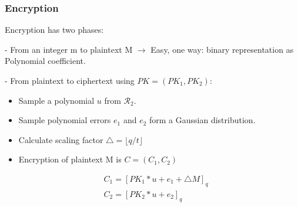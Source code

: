 \documentclass[10pt,handout]{beamer}
\begin{document}
\begin{frame}[noframenumbering]

    \frametitle{Encryption}

    Encryption has two phases:

    - From an integer m to plaintext M $\rightarrow$ Easy, one way: binary representation as Polynomial coefficient.

    - From plaintext to ciphertext using $PK = (PK_1, PK_2)$:

    \begin{itemize}
        \item Sample a polynomial $u$ from $\mathcal{R}_2$.
        \item Sample polynomial errors $e_1$ and $e_2$ form a Gaussian distribution.
        \item Calculate scaling factor $\triangle = \lfloor q/t\rfloor $
        \item Encryption of plaintext M is $C=(C_1, C_2)$
    \end{itemize}
    \begin{align}
        &C_1 = [PK_1 * u + e_1 + \triangle M ]_q\nonumber \\
        &C_2 = [PK_2 * u + e_2]_q\nonumber
    \end{align}


\end{frame}
\end{document}
